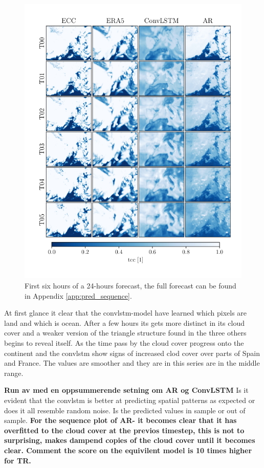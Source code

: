 \begin{figure}[ht]
    \centering
    \includegraphics[sale=0.1]{python_figs/comparing_seq_part_1_of4_jan2.png}
    \caption{First six hours of a 24-hours forecast, the full forecast can be found in Appendix \ref{app:pred_sequence}.}
    \label{fig:pred_sequence}
\end{figure}
At first glance it clear that the \acrshort{convlstm}-model have learned which pixels are land and which is ocean. After a few hours its gets more distinct in its cloud cover and a weaker version of the triangle structure found in the three others begins to reveal itself. As the time pass by the cloud cover progress onto the continent and the \acrshort{convlstm} show signs of increased clod cover over parts of Spain and France.
The values are smoother and they are in this series are in the middle range.


\textbf{Run av med en oppsummerende setning om AR og ConvLSTM}
Is it evident that the \acrshort{convlstm} is better at predicting spatial patterns as expected or does it all resemble random noise. Is the predicted values in sample or out of sample. \textbf{For the sequence plot of AR- it becomes clear that it has overfitted to the cloud cover at the previos timestep, this is not to surprising, makes dampend copies of the cloud cover until it becomes clear. Comment the score on the equivilent model is 10 times higher for TR.}

